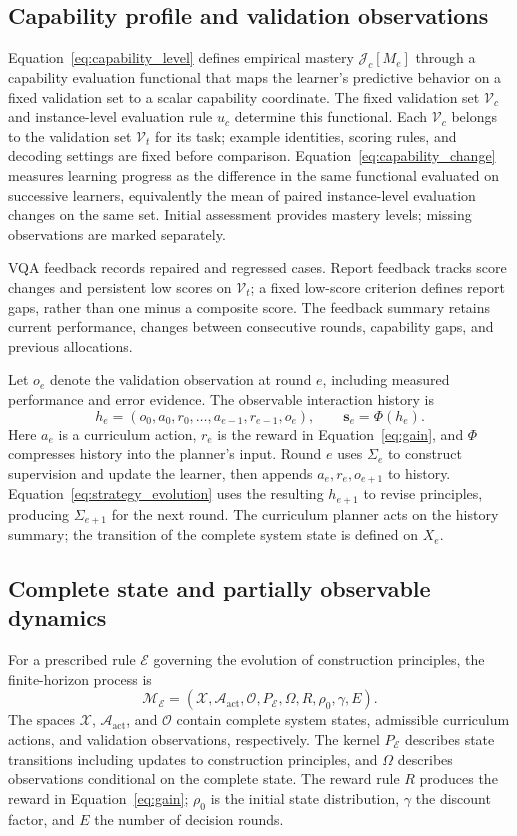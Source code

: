 \subsection{Capability profile and validation observations}

Equation~\ref{eq:capability_level} defines empirical mastery $\mathcal J_c[M_e]$ through a capability evaluation functional that maps the learner's predictive behavior on a fixed validation set to a scalar capability coordinate. The fixed validation set $\mathcal V_c$ and instance-level evaluation rule $u_c$ determine this functional. Each $\mathcal V_c$ belongs to the validation set $\mathcal V_t$ for its task; example identities, scoring rules, and decoding settings are fixed before comparison. Equation~\ref{eq:capability_change} measures learning progress as the difference in the same functional evaluated on successive learners, equivalently the mean of paired instance-level evaluation changes on the same set. Initial assessment provides mastery levels; missing observations are marked separately.

VQA feedback records repaired and regressed cases. Report feedback tracks score changes and persistent low scores on $\mathcal V_t$; a fixed low-score criterion defines report gaps, rather than one minus a composite score. The feedback summary retains current performance, changes between consecutive rounds, capability gaps, and previous allocations.

Let $o_e$ denote the validation observation at round $e$, including measured performance and error evidence. The observable interaction history is
\[
h_e=(o_0,a_0,r_0,\ldots,a_{e-1},r_{e-1},o_e),
\qquad \mathbf{s}_e=\Phi(h_e).
\]
Here $a_e$ is a curriculum action, $r_e$ is the reward in Equation~\ref{eq:gain}, and $\Phi$ compresses history into the planner's input. Round $e$ uses $\Sigma_e$ to construct supervision and update the learner, then appends $a_e,r_e,o_{e+1}$ to history. Equation~\ref{eq:strategy_evolution} uses the resulting $h_{e+1}$ to revise principles, producing $\Sigma_{e+1}$ for the next round. The curriculum planner acts on the history summary; the transition of the complete system state is defined on $X_e$.

\subsection{Complete state and partially observable dynamics}

For a prescribed rule $\mathscr E$ governing the evolution of construction principles, the finite-horizon process is
\[
\mathcal M_{\mathscr E}=(\mathcal X,\mathcal A_{\mathrm{act}},\mathcal O,P_{\mathscr E},\Omega,R,\rho_0,\gamma,E).
\]
The spaces $\mathcal X$, $\mathcal A_{\mathrm{act}}$, and $\mathcal O$ contain complete system states, admissible curriculum actions, and validation observations, respectively. The kernel $P_{\mathscr E}$ describes state transitions including updates to construction principles, and $\Omega$ describes observations conditional on the complete state. The reward rule $R$ produces the reward in Equation~\ref{eq:gain}; $\rho_0$ is the initial state distribution, $\gamma$ the discount factor, and $E$ the number of decision rounds.

